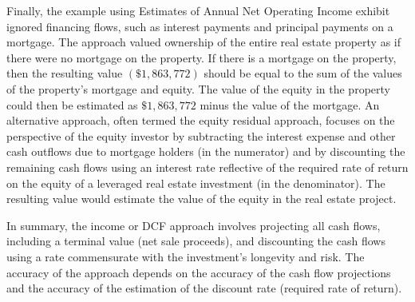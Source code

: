 \documentclass[11pt]{article}
\begin{document}
Finally, the example using Estimates of Annual Net Operating Income exhibit ignored financing flows, such as interest payments and principal payments on a mortgage. The approach valued ownership of the entire real estate property as if there were no mortgage on the property. If there is a mortgage on the property, then the resulting value $(\$ 1,863,772)$ should be equal to the sum of the values of the property's mortgage and equity. The value of the equity in the property could then be estimated as $\$ 1,863,772$ minus the value of the mortgage. An alternative approach, often termed the equity residual approach, focuses on the perspective of the equity investor by subtracting the interest expense and other cash outflows due to mortgage holders (in the numerator) and by discounting the remaining cash flows using an interest rate reflective of the required rate of return on the equity of a leveraged real estate investment (in the denominator). The resulting value would estimate the value of the equity in the real estate project.

In summary, the income or DCF approach involves projecting all cash flows, including a terminal value (net sale proceeds), and discounting the cash flows using a rate commensurate with the investment's longevity and risk. The accuracy of the approach depends on the accuracy of the cash flow projections and the accuracy of the estimation of the discount rate (required rate of return).
\end{document}
